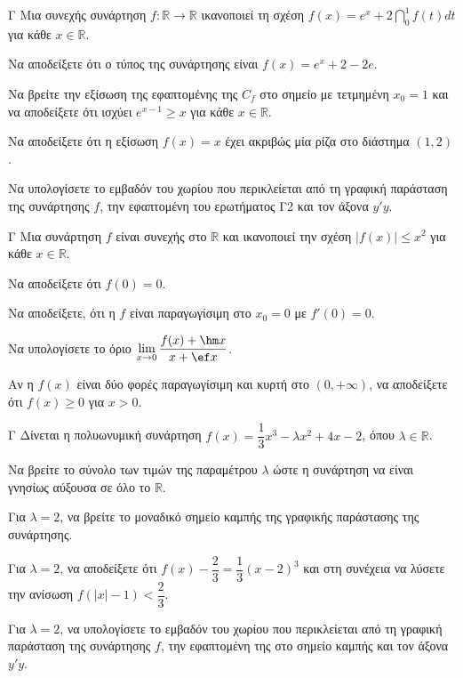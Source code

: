 \begin{thema}{Γ}
Μια συνεχής συνάρτηση $f: \mathbb{R} \to \mathbb{R}$ ικανοποιεί τη σχέση $f(x) = e^x + 2\dint_0^1 f(t)dt$ για κάθε $x \in \mathbb{R}$.
\begin{erwthma}
  \item Να αποδείξετε ότι ο τύπος της συνάρτησης είναι $f(x) = e^x + 2 - 2e$.
  \item Να βρείτε την εξίσωση της εφαπτομένης της $C_f$ στο σημείο με τετμημένη $x_0 = 1$ και να αποδείξετε ότι ισχύει $e^{x-1} \ge x$ για κάθε $x \in \mathbb{R}$.
  \item Να αποδείξετε ότι η εξίσωση $f(x) = x$ έχει ακριβώς μία ρίζα στο διάστημα $(1, 2)$.
  \item Να υπολογίσετε το εμβαδόν του χωρίου που περικλείεται από τη γραφική παράσταση της συνάρτησης $f$, την εφαπτομένη του ερωτήματος Γ2 και τον άξονα $y'y$.
\end{erwthma}
\end{thema}

\begin{thema}{Γ}
Μια συνάρτηση $f$ είναι συνεχής στο $\mathbb{R}$ και ικανοποιεί την σχέση $|f(x)| \le x^2$ για κάθε $x \in \mathbb{R}$.
\begin{erwthma}
  \item Nα αποδείξετε ότι $f(0) = 0$.
  \item Να αποδείξετε, ότι η $f$ είναι παραγωγίσιμη στο $x_0=0$ με $f'(0) = 0$.
  \item Να υπολογίσετε το όριο $\lim\limits_{x \to 0} \dfrac{f(x) + \hm x}{x + \ef x}$.
  \item Αν η $f(x)$ είναι δύο φορές παραγωγίσιμη και κυρτή στο $(0, +\infty)$, να αποδείξετε ότι $f(x) \ge 0$ για $x > 0$.
\end{erwthma}
\end{thema}

\begin{thema}{Γ}
Δίνεται η πολυωνυμική συνάρτηση $f(x) = \dfrac{1}{3}x^3 - \lambda x^2 + 4x - 2$, όπου $\lambda \in \mathbb{R}$.
\begin{erwthma}
  \item Να βρείτε το σύνολο των τιμών της παραμέτρου $\lambda$ ώστε η συνάρτηση να είναι γνησίως αύξουσα σε όλο το $\mathbb{R}$.
  \item Για $\lambda = 2$, να βρείτε το μοναδικό σημείο καμπής της γραφικής παράστασης της συνάρτησης.
  \item Για $\lambda = 2$, να αποδείξετε ότι $f(x) - \dfrac{2}{3} = \dfrac{1}{3}(x-2)^3$ και στη συνέχεια να λύσετε την ανίσωση $f(|x| - 1) < \dfrac{2}{3}$.
  \item Για $\lambda = 2$, να υπολογίσετε το εμβαδόν του χωρίου που περικλείεται από τη γραφική παράσταση της συνάρτησης $f$, την εφαπτομένη της στο σημείο καμπής και τον άξονα $y'y$.
\end{erwthma}
\end{thema}

